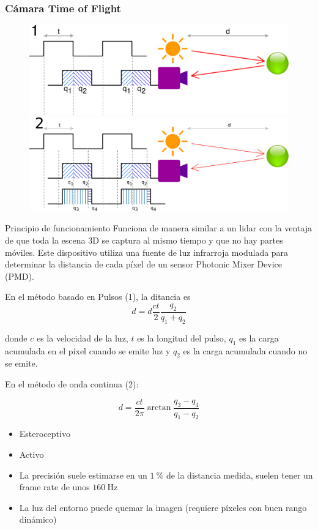 \begin{frame}
    \frametitle{Cámara Time of Flight}
    \scriptsize

    \begin{figure}[!h]
        \includegraphics[width=0.4\columnwidth]{images/time_of_flight_camera_pulse.pdf}
        \includegraphics[width=0.4\columnwidth]{images/time_of_flight_camera_continuous_wave.pdf}
    \end{figure}
    
    \begin{block}{Principio de funcionamiento}
        Funciona de manera similar a un lidar con la ventaja de que toda la escena 3D se captura al mismo tiempo y que no hay partes móviles. Este dispositivo utiliza una fuente de luz infrarroja modulada para determinar la distancia de cada píxel de un sensor Photonic Mixer Device (PMD).
        
        En el método basado en Pulsos (1), la ditancia es
        \begin{equation*}
            d = d\frac{c t}{2} \dfrac{q_{2}}{q_{1} + q_{2}}
        \end{equation*}
        
        donde $c$ es la velocidad de la luz, $t$ es la longitud del pulso, $q_{1}$ es la carga acumulada en el píxel cuando se emite luz y $q_{2}$ es la carga acumulada cuando no se emite.
        
        En el método de onda continua (2):
        
        \begin{equation*}
            d = \frac{c t}{2\pi} \arctan \dfrac{q_{3} - q_{4}}{q_{1} - q_{2}}
        \end{equation*}        
    \end{block}
    
    \begin{itemize}
        \item Esteroceptivo
        \item Activo
        \item La precisión suele estimarse en un $\SI{1}{\percent}$ de la distancia medida, suelen tener un frame rate de unos $\SI{160}{\hertz}$
        \item La luz del entorno puede quemar la imagen (requiere píxeles con buen rango dinámico)
    \end{itemize}
    
\end{frame}